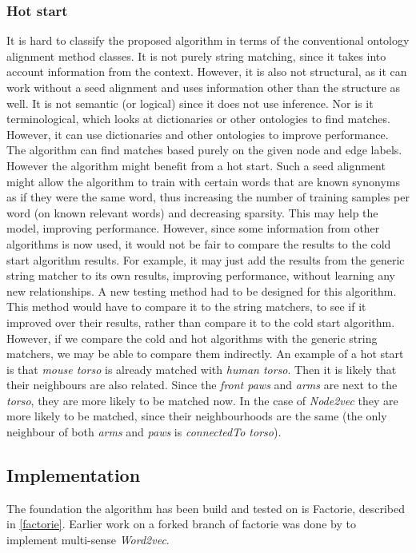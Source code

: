 \documentclass{article}
\begin{document}
  \subsubsection{Hot start}
  It is hard to classify the proposed algorithm in terms of the conventional ontology alignment method classes. It is not purely string matching, since it takes into account information from the context. However, it is also not structural, as it can work without a seed alignment and uses information other than the structure as well. It is not semantic (or logical) since it does not use inference. Nor is it terminological, which looks at dictionaries or other ontologies to find matches. However, it can use dictionaries and other ontologies to improve performance.
  The algorithm can find matches based purely on the given node and edge labels. However the algorithm might benefit from a hot start. Such a seed alignment might allow the algorithm to train with certain words that are known synonyms as if they were the same word, thus increasing the number of training samples per word (on known relevant words) and decreasing sparsity. This may help the model, improving performance. However, since some information from other algorithms is now used, it would not be fair to compare the results to the cold start algorithm results. For example, it may just add the results from the generic string matcher to its own results, improving performance, without learning any new relationships. A new testing method had to be designed for this algorithm. This method would have to compare it to the string matchers, to see if it improved over their results, rather than compare it to the cold start algorithm. However, if we compare the cold and hot algorithms with the generic string matchers, we may be able to compare them indirectly.
  An example of a hot start is that \emph{mouse torso} is already matched with \emph{human torso}. Then it is likely that their neighbours are also related. Since the \emph{front paws} and \emph{arms} are next to the \emph{torso}, they are more likely to be matched now. In the case of \emph{Node2vec} they are more likely to be matched, since their neighbourhoods are the same (the only neighbour of both \emph{arms} and \emph{paws} is \emph{connectedTo torso}).

 \subsection{Implementation}
 The foundation the algorithm has been build and tested on is Factorie, described in \ref{factorie}. Earlier work on a forked branch of factorie was done by \cite{multisensecode} to implement multi-sense \emph{Word2vec}.
 
\end{document}
